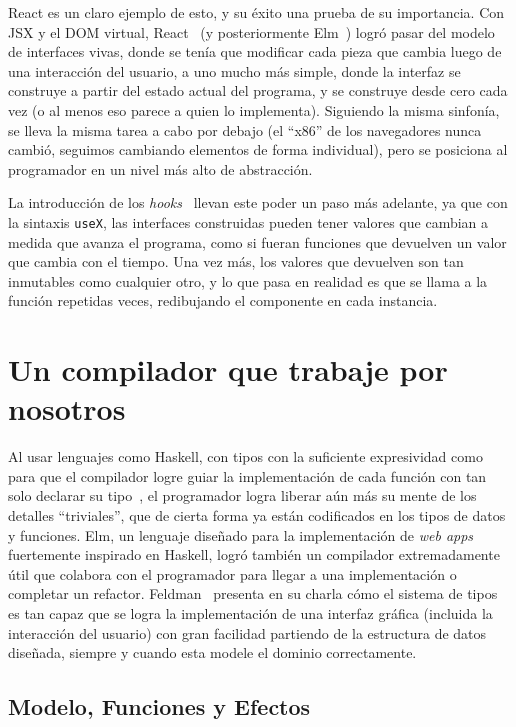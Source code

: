 \documentclass[12pt]{article}
\begin{document}
React es un claro ejemplo de esto, y su éxito una prueba de su importancia.
Con JSX y el DOM virtual, React~\autocite{flux} (y posteriormente
Elm~\autocite{elmarch}) logró pasar del modelo de interfaces vivas, donde se
tenía que modificar cada pieza que cambia luego de una interacción del usuario,
a uno mucho más simple, donde la interfaz se construye a partir del estado
actual del programa, y se construye desde cero cada vez (o al menos eso parece
a quien lo implementa).
Siguiendo la misma sinfonía, se lleva la misma tarea a cabo por debajo (el
``x86'' de los navegadores nunca cambió, seguimos cambiando elementos de forma
individual), pero se posiciona al programador en un nivel más alto de
abstracción.

La introducción de los \emph{hooks}~\autocite{hooks} llevan este poder
un paso más adelante, ya que con la sintaxis \texttt{useX}, las interfaces
construidas pueden tener valores que cambian a medida que avanza el programa,
como si fueran funciones que devuelven un valor que cambia con el tiempo.
Una vez más, los valores que devuelven son tan inmutables como cualquier otro,
y lo que pasa en realidad es que se llama a la función repetidas veces,
redibujando el componente en cada instancia.

\section{Un compilador que trabaje por nosotros}

Al usar lenguajes como Haskell, con tipos con la suficiente expresividad como
para que el compilador logre guiar la implementación de cada función con tan
solo declarar su tipo~\autocite{typeholes}, el programador logra liberar aún más
su mente de los detalles ``triviales'', que de cierta forma ya están
codificados en los tipos de datos y funciones.
Elm, un lenguaje diseñado para la implementación de \emph{web apps} fuertemente
inspirado en Haskell, logró también un compilador extremadamente útil que colabora
con el programador para llegar a una implementación o completar un refactor.
Feldman~\autocite{elmdatastructure} presenta en su charla cómo el sistema de
tipos es tan capaz que se logra la implementación de una interfaz gráfica
(incluida la interacción del usuario) con gran facilidad partiendo de la
estructura de datos diseñada, siempre y cuando esta modele el dominio
correctamente.

\subsection{Modelo, Funciones y Efectos}
\end{document}
